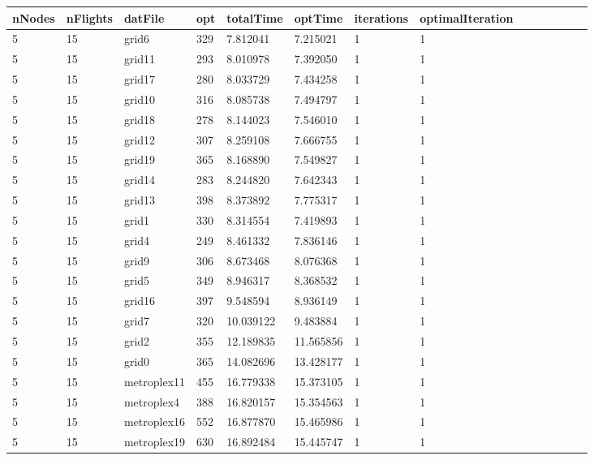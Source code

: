 \documentclass[../thesis.tex]{subfiles}
\begin{document}
\begin{table}[!ht]
    \centering
    \begin{tabularx}{\textwidth}{|X|X|X|X|X|X|X|X|X|X|X|X|X|X|}
    \hline
    nNodes & nFlights & datFile & opt & totalTime & optTime & iterations & optimalIteration \\ \hline
        5 & 15 & grid6 & 329 & 7.812041 & 7.215021 & 1 & 1 \\ \hline
        5 & 15 & grid11 & 293 & 8.010978 & 7.392050 & 1 & 1 \\ \hline
        5 & 15 & grid17 & 280 & 8.033729 & 7.434258 & 1 & 1 \\ \hline
        5 & 15 & grid10 & 316 & 8.085738 & 7.494797 & 1 & 1 \\ \hline
        5 & 15 & grid18 & 278 & 8.144023 & 7.546010 & 1 & 1 \\ \hline
        5 & 15 & grid12 & 307 & 8.259108 & 7.666755 & 1 & 1 \\ \hline
        5 & 15 & grid19 & 365 & 8.168890 & 7.549827 & 1 & 1 \\ \hline
        5 & 15 & grid14 & 283 & 8.244820 & 7.642343 & 1 & 1 \\ \hline
        5 & 15 & grid13 & 398 & 8.373892 & 7.775317 & 1 & 1 \\ \hline
        5 & 15 & grid1 & 330 & 8.314554 & 7.419893 & 1 & 1 \\ \hline
        5 & 15 & grid4 & 249 & 8.461332 & 7.836146 & 1 & 1 \\ \hline
        5 & 15 & grid9 & 306 & 8.673468 & 8.076368 & 1 & 1 \\ \hline
        5 & 15 & grid5 & 349 & 8.946317 & 8.368532 & 1 & 1 \\ \hline
        5 & 15 & grid16 & 397 & 9.548594 & 8.936149 & 1 & 1 \\ \hline
        5 & 15 & grid7 & 320 & 10.039122 & 9.483884 & 1 & 1 \\ \hline
        5 & 15 & grid2 & 355 & 12.189835 & 11.565856 & 1 & 1 \\ \hline
        5 & 15 & grid0 & 365 & 14.082696 & 13.428177 & 1 & 1 \\ \hline
        5 & 15 & metroplex11 & 455 & 16.779338 & 15.373105 & 1 & 1 \\ \hline
        5 & 15 & metroplex4 & 388 & 16.820157 & 15.354563 & 1 & 1 \\ \hline
        5 & 15 & metroplex16 & 552 & 16.877870 & 15.465986 & 1 & 1 \\ \hline
        5 & 15 & metroplex19 & 630 & 16.892484 & 15.445747 & 1 & 1 \\ \hline

\end{tabularx}
\end{table}
\end{document}
